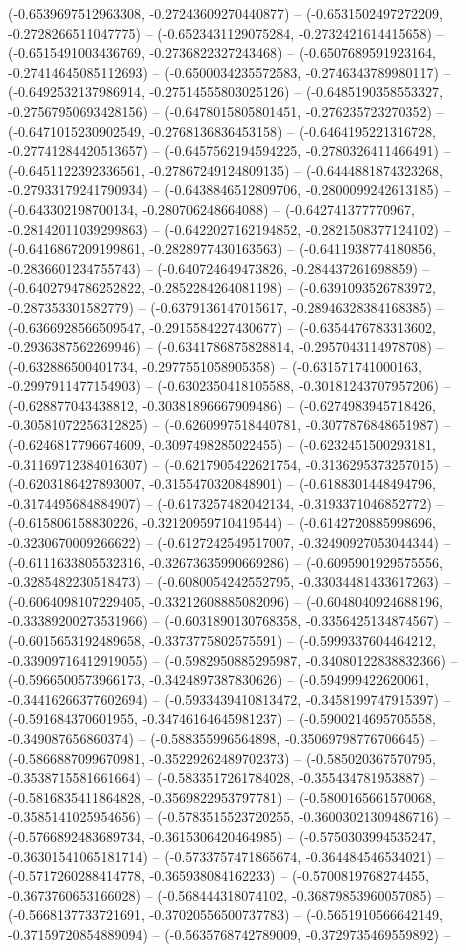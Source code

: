 (-0.6539697512963308, -0.27243609270440877) -- (-0.6531502497272209, -0.2728266511047775) -- (-0.6523431129075284, -0.2732421614415658) -- (-0.6515491003436769, -0.2736822327243468) -- (-0.6507689591923164, -0.27414645085112693) -- (-0.6500034235572583, -0.2746343789980117) -- (-0.6492532137986914, -0.27514555803025126) -- (-0.6485190358553327, -0.27567950693428156) -- (-0.6478015805801451, -0.276235723270352) -- (-0.6471015230902549, -0.2768136836453158) -- (-0.6464195221316728, -0.27741284420513657) -- (-0.6457562194594225, -0.2780326411466491) -- (-0.6451122392336561, -0.27867249124809135) -- (-0.6444881874323268, -0.27933179241790934) -- (-0.6438846512809706, -0.2800099242613185) -- (-0.643302198700134, -0.280706248664088) -- (-0.642741377770967, -0.28142011039299863) -- (-0.6422027162194852, -0.2821508377124102) -- (-0.6416867209199861, -0.2828977430163563) -- (-0.6411938774180856, -0.2836601234755743) -- (-0.640724649473826, -0.284437261698859) -- (-0.6402794786252822, -0.2852284264081198) -- (-0.6391093526783972, -0.287353301582779) -- (-0.6379136147015617, -0.28946328384168385) -- (-0.6366928566509547, -0.2915584227430677) -- (-0.6354476783313602, -0.2936387562269946) -- (-0.6341786875828814, -0.2957043114978708) -- (-0.632886500401734, -0.2977551058905358) -- (-0.631571741000163, -0.2997911477154903) -- (-0.6302350418105588, -0.30181243707957206) -- (-0.628877043438812, -0.30381896667909486) -- (-0.6274983945718426, -0.30581072256312825) -- (-0.6260997518440781, -0.3077876848651987) -- (-0.6246817796674609, -0.3097498285022455) -- (-0.6232451500293181, -0.31169712384016307) -- (-0.6217905422621754, -0.3136295373257015) -- (-0.6203186427893007, -0.3155470320848901) -- (-0.6188301448494796, -0.3174495684884907) -- (-0.6173257482042134, -0.3193371046852772) -- (-0.615806158830226, -0.32120959710419544) -- (-0.6142720885998696, -0.3230670009266622) -- (-0.6127242549517007, -0.32490927053044344) -- (-0.6111633805532316, -0.32673635990669286) -- (-0.6095901929575556, -0.3285482230518473) -- (-0.6080054242552795, -0.33034481433617263) -- (-0.6064098107229405, -0.33212608885082096) -- (-0.6048040924688196, -0.33389200273531966) -- (-0.6031890130768358, -0.3356425134874567) -- (-0.6015653192489658, -0.3373775802575591) -- (-0.5999337604464212, -0.33909716412919055) -- (-0.5982950885295987, -0.34080122838832366) -- (-0.5966500573966173, -0.3424897387830626) -- (-0.594999422620061, -0.34416266377602694) -- (-0.5933439410813472, -0.3458199747915397) -- (-0.591684370601955, -0.34746164645981237) -- (-0.5900214695705558, -0.349087656860374) -- (-0.588355996564898, -0.35069798776706645) -- (-0.5866887099670981, -0.35229262489702373) -- (-0.585020367570795, -0.3538715581661664) -- (-0.5833517261784028, -0.355434781953887) -- (-0.5816835411864828, -0.3569822953797781) -- (-0.5800165661570068, -0.3585141025954656) -- (-0.5783515523720255, -0.36003021309486716) -- (-0.5766892483689734, -0.3615306420464985) -- (-0.5750303994535247, -0.36301541065181714) -- (-0.5733757471865674, -0.364484546534021) -- (-0.5717260288414778, -0.365938084162233) -- (-0.5700819768274455, -0.3673760653166028) -- (-0.568444318074102, -0.36879853960057085) -- (-0.5668137733721691, -0.37020556500737783) -- (-0.5651910566642149, -0.37159720854889094) -- (-0.5635768742789009, -0.3729735469559892) -- 